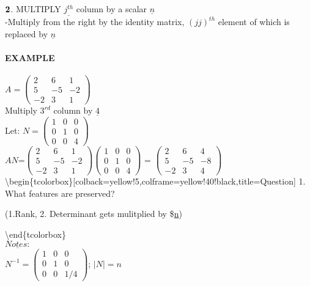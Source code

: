 \documentclass[]{article}
\let\oldparagraph\paragraph
\renewcommand{\paragraph}[1]{\oldparagraph{#1}\mbox{}}
\begin{document}
\(\bold{2}\). MULTIPLY \(\underline{j^{th}}\) column by a scalar
\(\underline{n}\)\\

-Multiply from the right by the identity matrix, \((jj)^{th}\) element
of which is replaced by \(\underline{n}\)\\

\paragraph{\texorpdfstring{EXAMPLE\\
}{EXAMPLE }}\label{example-9}

\(A =\begin{pmatrix} 2 & 6 & 1\\ 5 & -5 & -2 \\ -2 & 3 & 1 \end{pmatrix}\)\\

Multiply \(3^{rd}\) column by \(\underline{4}\)\\

Let:
\(N =\begin{pmatrix} 1 & 0 & 0\\ 0 & 1 & 0 \\ 0 & 0 & 4 \end{pmatrix}\)\\

\(AN\)=\(\begin{pmatrix} 2 & 6 & 1\\ 5 & -5 & -2 \\ -2 & 3 & 1 \end{pmatrix}\begin{pmatrix} 1 & 0 & 0\\ 0 & 1 & 0 \\ 0 & 0 & 4 \end{pmatrix}\)
=
\(\begin{pmatrix} 2 & 6 & 4\\ 5 & -5 & -8 \\ -2 & 3 & 4 \end{pmatrix}\)\\

\textbackslash{}begin\{tcolorbox\}{[}colback=yellow!5,colframe=yellow!40!black,title=Question{]}
1. What features are preserved?

(1.Rank, 2. Determinant gets mulitplied by \$\underline{n})

\textbackslash{}end\{tcolorbox\}\\

\(\underline{Notes:}\)\\

\(N^{-1} =\begin{pmatrix} 1 & 0 & 0\\ 0 & 1 & 0 \\ 0 & 0 & 1/4 \end{pmatrix}\);
\(|N|= n\)\\
\end{document}
